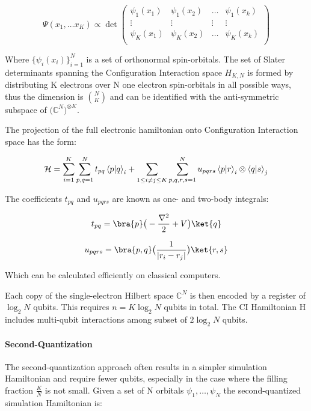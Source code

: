 \begin{equation*}
    \Psi(x_1, \dots x_K) \propto \det  \begin{pmatrix}
    \psi_1(x_1) & \psi_1(x_2) & \dots & \psi_1(x_k) \\
    \vdots & \vdots &  \vdots &  \vdots \\
    \psi_K(x_1) & \psi_K(x_2) & \dots & \psi_K(x_k) \\
    \end{pmatrix}
\end{equation*}

Where $\{ \psi_i(x_i) \}^N_{i=1}$ is a set of orthonormal spin-orbitals. The set of Slater determinants spanning the Configuration Interaction space $H_{K,N}$ is formed by distributing K electrons over N one electron spin-orbitals in all possible ways, thus the dimension is $\binom{N}{K}$ and can be identified with the anti-symmetric subspace of $\big( \mathbb{C}^N \big)^{\otimes K}$.

The projection of the full electronic hamiltonian onto Configuration Interaction space has the form:

\begin{equation}
    \mathcal{H} = \sum_{i=1}^K \sum_{p,q=1}^N t_{pq} \left\langle{p}\middle\vert{q}\right\rangle_i + \sum_{1 \leq i \neq j \leq K} \sum_{p,q,r,s = 1}^N u_{pqrs} \left\langle{p}\middle\vert{r}\right\rangle_i \otimes \left\langle{q}\middle\vert{s}\right\rangle_j
\end{equation}

The coefficients $t_{pq}$ and $u_{pqrs}$ are known as one- and two-body integrals:

\begin{equation*}
    t_{pq} = \bra{p} \big(- \frac{\nabla^2}{2} + V \big) \ket{q} 
\end{equation*}

\begin{equation*}
    u_{pqrs} = \bra{p,q} \big( \frac{1}{|r_i - r_j|} \big) \ket{r,s} 
\end{equation*}

Which can be calculated efficiently on classical computers.

Each copy of the single-electron Hilbert space $\mathbb{C}^N$ is then encoded by a register of $\log_2 N$ qubits. This requires $n = K \log_2 N$ qubits in total. The CI Hamiltonian H includes multi-qubit interactions among subset of $2 \log_2 N$ qubits.

\paragraph{Second-Quantization} The second-quantization approach often results in a simpler simulation Hamiltonian and require fewer qubits, especially in the case where the filling fraction $\frac{K}{N}$ is not small. Given a set of N orbitals $\psi_1, \dots, \psi_N$ the second-quantized simulation Hamiltonian is:

